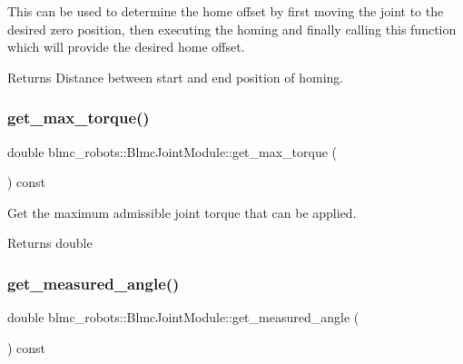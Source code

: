 This can be used to determine the home offset by first moving the joint to the desired zero position, then executing the homing and finally calling this function which will provide the desired home offset.

\begin{DoxyReturn}{Returns}
Distance between start and end position of homing. 
\end{DoxyReturn}
\mbox{\label{classblmc__robots_1_1BlmcJointModule_a53be7ff5c2b54c15813a68116e85747e}} 
\subsubsection{\texorpdfstring{get\+\_\+max\+\_\+torque()}{get\_max\_torque()}}
{\footnotesize\ttfamily double blmc\+\_\+robots\+::\+Blmc\+Joint\+Module\+::get\+\_\+max\+\_\+torque (\begin{DoxyParamCaption}{ }\end{DoxyParamCaption}) const}



Get the maximum admissible joint torque that can be applied. 

\begin{DoxyReturn}{Returns}
double 
\end{DoxyReturn}
\mbox{\label{classblmc__robots_1_1BlmcJointModule_a8c6419cfb80eb5986dffd982df18a817}} 
\subsubsection{\texorpdfstring{get\+\_\+measured\+\_\+angle()}{get\_measured\_angle()}}
{\footnotesize\ttfamily double blmc\+\_\+robots\+::\+Blmc\+Joint\+Module\+::get\+\_\+measured\+\_\+angle (\begin{DoxyParamCaption}{ }\end{DoxyParamCaption}) const}



